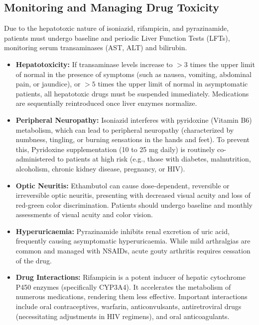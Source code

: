 \subsection*{Monitoring and Managing Drug Toxicity}
Due to the hepatotoxic nature of isoniazid, rifampicin, and pyrazinamide, patients must undergo baseline and periodic Liver Function Tests (LFTs), monitoring serum transaminases (AST, ALT) and bilirubin.
\begin{itemize}
    \item \textbf{Hepatotoxicity:} If transaminase levels increase to $>3$ times the upper limit of normal in the presence of symptoms (such as nausea, vomiting, abdominal pain, or jaundice), or $>5$ times the upper limit of normal in asymptomatic patients, all hepatotoxic drugs must be suspended immediately. Medications are sequentially reintroduced once liver enzymes normalize.
    \item \textbf{Peripheral Neuropathy:} Isoniazid interferes with pyridoxine (Vitamin B6) metabolism, which can lead to peripheral neuropathy (characterized by numbness, tingling, or burning sensations in the hands and feet). To prevent this, Pyridoxine supplementation (10 to 25 mg daily) is routinely co-administered to patients at high risk (e.g., those with diabetes, malnutrition, alcoholism, chronic kidney disease, pregnancy, or HIV).
    \item \textbf{Optic Neuritis:} Ethambutol can cause dose-dependent, reversible or irreversible optic neuritis, presenting with decreased visual acuity and loss of red-green color discrimination. Patients should undergo baseline and monthly assessments of visual acuity and color vision.
    \item \textbf{Hyperuricaemia:} Pyrazinamide inhibits renal excretion of uric acid, frequently causing asymptomatic hyperuricaemia. While mild arthralgias are common and managed with NSAIDs, acute gouty arthritis requires cessation of the drug.
    \item \textbf{Drug Interactions:} Rifampicin is a potent inducer of hepatic cytochrome P450 enzymes (specifically CYP3A4). It accelerates the metabolism of numerous medications, rendering them less effective. Important interactions include oral contraceptives, warfarin, anticonvulsants, antiretroviral drugs (necessitating adjustments in HIV regimens), and oral anticoagulants.
\end{itemize}

